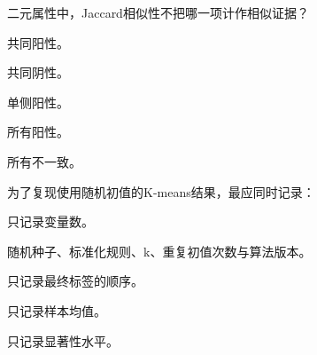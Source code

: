 \par\addvspace{6pt}\noindent\begin{minipage}{\linewidth}


二元属性中，Jaccard相似性不把哪一项计作相似证据？


\begin{choices}

\item 共同阳性。

\item 共同阴性。

\item 单侧阳性。

\item 所有阳性。

\item 所有不一致。

\end{choices}

\end{minipage}\par\vspace{4pt}

\par\addvspace{6pt}\noindent\begin{minipage}{\linewidth}


为了复现使用随机初值的K-means结果，最应同时记录：


\begin{choices}

\item 只记录变量数。

\item 随机种子、标准化规则、k、重复初值次数与算法版本。

\item 只记录最终标签的顺序。

\item 只记录样本均值。

\item 只记录显著性水平。

\end{choices}

\end{minipage}\par\vspace{4pt}

